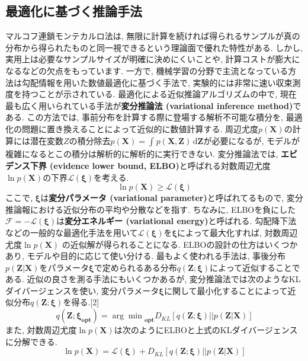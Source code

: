 \documentclass[twocolumn]{jarticle}
\begin{document}
\subsection{最適化に基づく推論手法}
マルコフ連鎖モンテカルロ法は, 無限に計算を続ければ得られるサンプルが真の分布から得られたものと同一視できるという理論面で優れた特性がある. しかし, 実用上は必要なサンプルサイズが明確に決めにくいことや, 計算コストが膨大になるなどの欠点をもっています. 一方で, 機械学習の分野で主流となっている方法は勾配情報を用いた数値最適化に基づく手法で, 実験的には非常に速い収束測度を持つことが示されている.
最適化による近似推論アルゴリズムの中で, 現在最も広く用いられている手法が{\bf 変分推論法 (variational inference method)}である. この方法では, 事前分布を計算する際に登場する解析不可能な積分を, 最適化の問題に置き換えることによって近似的に数値計算する. 周辺尤度${p(\bm {X})}$の計算には潜在変数${Z}$の積分除去${p(\bm {X}) = \int_{}^{} p(\bm {X, Z}) \,\mathrm{d}{\bm {Z}} }$が必要になるが, モデルが複雑になるとこの積分は解析的に解析的に実行できない. 変分推論法では, {\bf エビデンス下界 (evidence lower bound, ELBO)}と呼ばれる対数周辺尤度${\ln p(\bm {X})}$の下界${\mathcal{L} (\bm {\xi })}$を考える.
\begin{equation}
  \ln p(\bm {X}) \geq \mathcal{L}(\bm {\xi})
\end{equation}
ここで, ${\bm {\xi}}$は{\bf 変分パラメータ (variational parameter)}と呼ばれてるもので, 変分推論報における近似分布の平均や分散などを指す. ちなみに, ELBOを負にした${\mathcal{F} = -\mathcal{L}(\bm {\xi})}$は{\bf 変分エネルギー (variational energy)}と呼ばれる. 勾配降下法などの一般的な最適化手法を用いて${\mathcal{L}(\bm {\xi})}$を${\bm {\xi}}$によって最大化すれば, 対数周辺尤度${\ln p(\bm {X})}$ の近似解が得られることになる.
ELBOの設計の仕方はいくつかあり, モデルや目的に応じて使い分ける. 最もよく使われる手法は, 事後分布${p(\bm{Z|X})}$をパラメータ${\bm {\xi}}$で定められるある分布${q(\bm {Z;\xi})}$によって近似することである. 近似の良さを測る手法にもいくつかあるが, 変分推論法では次のようなKLダイバージェンスを使い, 変分パラメータ${\bm {\xi}}$に関して最小化することによって近似分布${q(\bm {Z;\xi})}$を得る.[2]
\begin{equation}
  q(\bm {Z;\xi_{opt}}) = {\arg\min}_{\bm {opt}} D_{KL}[q(\bm {Z;\xi})||p(\bm {Z|X})]
\end{equation}
また, 対数周辺尤度${\ln p(\bm {X})}$は次のようにELBOと上式のKLダイバージェンスに分解できる.
\begin{equation}
  \ln p(\bm {X}) = \mathcal{L}(\bm {\xi}) + D_{KL}[q(\bm {Z;\xi})||p(\bm {Z|X})]
\end{equation}
\end{document}
